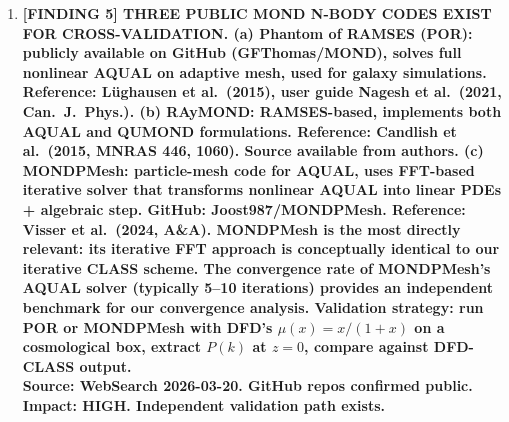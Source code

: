 \documentclass[11pt]{article}
\theoremstyle{definition}
\theoremstyle{remark}
\begin{document}
\begin{tcolorbox}[colback=blue!5!white, colframe=blue!60!black,
  title=\textbf{W4i21 TOP 5 FINDINGS --- RANKED BY IMPACT}]
\begin{enumerate}[nosep]
\item \textbf{[FINDING 5] THREE PUBLIC MOND N-BODY CODES EXIST FOR
  CROSS-VALIDATION.
  (a) \textbf{Phantom of RAMSES (POR)}: publicly available on GitHub
  (GFThomas/MOND), solves full nonlinear AQUAL on adaptive mesh,
  used for galaxy simulations. Reference: L\"ughausen et al.\ (2015),
  user guide Nagesh et al.\ (2021, Can.\ J.\ Phys.).
  (b) \textbf{RAyMOND}: RAMSES-based, implements both AQUAL and QUMOND
  formulations. Reference: Candlish et al.\ (2015, MNRAS 446, 1060).
  Source available from authors.
  (c) \textbf{MONDPMesh}: particle-mesh code for AQUAL, uses FFT-based
  iterative solver that transforms nonlinear AQUAL into linear PDEs +
  algebraic step. GitHub: Joost987/MONDPMesh.
  Reference: Visser et al.\ (2024, A\&A).
  MONDPMesh is the most directly relevant: its iterative FFT approach
  is conceptually identical to our iterative CLASS scheme. The
  convergence rate of MONDPMesh's AQUAL solver (typically 5--10
  iterations) provides an independent benchmark for our convergence
  analysis.
  \textbf{Validation strategy}: run POR or MONDPMesh with DFD's
  $\mu(x) = x/(1+x)$ on a cosmological box, extract $P(k)$ at $z = 0$,
  compare against DFD-CLASS output.}\\
  \textbf{Source: WebSearch 2026-03-20. GitHub repos confirmed public.}\\
  \textbf{Impact: HIGH. Independent validation path exists.}

\end{enumerate}
\end{tcolorbox}
\end{document}
